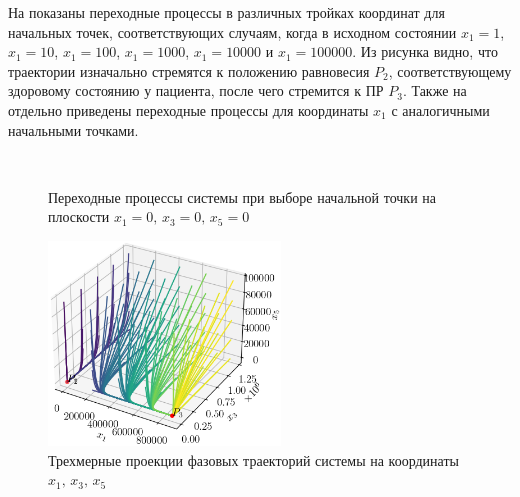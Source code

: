 \documentclass[14pt,a4paper]{extarticle}
\begin{document}
\begin{example}
		На  показаны переходные процессы в различных тройках координат для начальных точек, соответствующих случаям, когда в исходном состоянии $x_1=1$, $x_1=10$, $x_1=100$, $x_1=1000$, $x_1=10000$ и $x_1=100000$. Из рисунка видно, что траектории изначально стремятся к положению равновесия $P_2$, соответствующему здоровому состоянию у пациента, после чего стремится к ПР $P_3$. Также на  отдельно приведены переходные процессы для координаты $x_1$ с аналогичными начальными точками.
		
		\begin{figure}[h]
			\centering
			\\
			\caption{Переходные процессы системы при выборе начальной точки на плоскости $x_1=0,\, x_3=0,\, x_5=0$}
			\label{fig:on_D_border}
		\end{figure}
		\begin{figure}[h]
			\centering
			\includegraphics[width=0.55\textwidth]{media/Figure_12.png}
			\caption{Трехмерные проекции фазовых траекторий системы на координаты $x_1,\, x_3,\, x_5$}
			\label{fig:model_K5}
		\end{figure}
		

\end{example}
\end{document}
